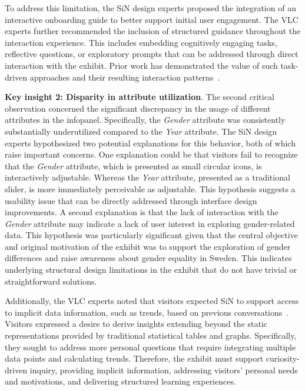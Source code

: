 \documentclass[preprint,journal]{vgtc}            %
\begin{document}
To address this limitation, the SiN design experts proposed the integration of an interactive onboarding guide to better support initial user engagement.
The VLC experts further recommended the inclusion of structured guidance throughout the interaction experience.
This includes embedding cognitively engaging tasks, reflective questions, or exploratory prompts that can be addressed through direct interaction with the exhibit.
Prior work has demonstrated the value of such task-driven approaches and their resulting interaction patterns~\cite{Yu25Revealing}.

\noindent 
\textbf{Key insight 2: Disparity in attribute utilization}.
The second critical observation concerned the significant discrepancy in the usage of different attributes in the infopanel.
Specifically, the \textit{Gender} attribute was consistently substantially underutilized compared to the \textit{Year} attribute. 
The SiN design experts hypothesized two potential explanations for this behavior, both of which raise important concerns.
One explanation could be that visitors fail to recognize that the \textit{Gender} attribute, which is presented as small circular icons, is interactively adjustable.
Whereas the \textit{Year} attribute, presented as a traditional slider, is more immediately perceivable as adjustable. 
This hypothesis suggests a usability issue that can be directly addressed through interface design improvements.
A second explanation is that the lack of interaction with the \textit{Gender} attribute may indicate a lack of user interest in exploring gender-related data.
This hypothesis was particularly significant given that the central objective and original motivation of the exhibit was to support the exploration of gender differences and raise awareness about gender equality in Sweden. %
This indicates underlying structural design limitations in the exhibit that do not have trivial or straightforward solutions.

Additionally, the VLC experts noted that visitors expected SiN to support access to implicit data information, such as trends, based on previous conversations~\cite{Yu25Revealing}.
Visitors expressed a desire to derive insights extending beyond the static representations provided by traditional statistical tables and graphs.
Specifically, they sought to address more personal questions that require integrating multiple data points and calculating trends.
Therefore, the exhibit must support curiosity-driven inquiry, providing implicit information, addressing visitors' personal needs and motivations, and delivering structured learning experiences.
\end{document}
